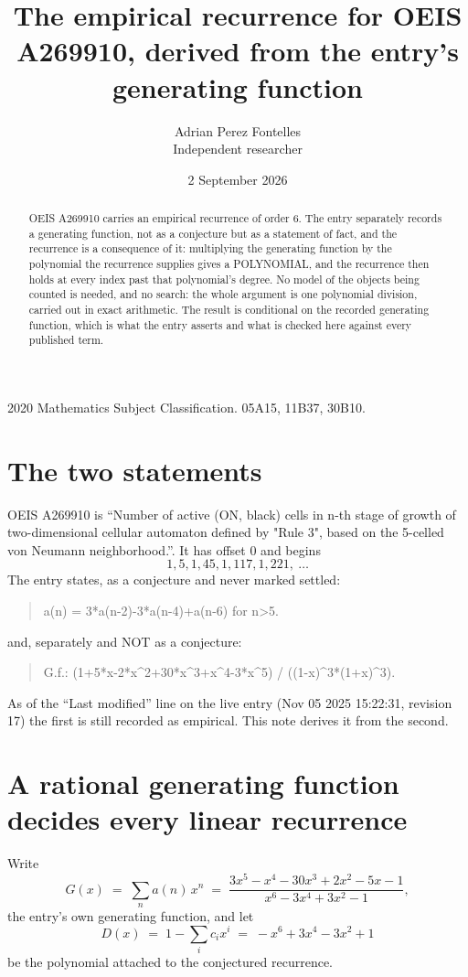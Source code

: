 \documentclass[11pt,a4paper]{article}
\title{The empirical recurrence for OEIS A269910, derived from the entry's generating function}
\author{Adrian Perez Fontelles\\ \small Independent researcher}
\date{2 September 2026}
\theoremstyle{plain}
\theoremstyle{definition}
\begin{document}
\maketitle

\begin{abstract}
OEIS A269910 carries an empirical recurrence of order $6$. The entry separately records a
generating function, not as a conjecture but as a statement of fact, and the recurrence is a
consequence of it: multiplying the generating function by the polynomial the recurrence
supplies gives a POLYNOMIAL, and the recurrence then holds at every index past that
polynomial's degree. No model of the objects being counted is needed, and no search: the
whole argument is one polynomial division, carried out in exact arithmetic. The result is
conditional on the recorded generating function, which is what the entry asserts and what is
checked here against every published term.
\end{abstract}

\noindent\small 2020 Mathematics Subject Classification. 05A15, 11B37, 30B10.\normalsize

\section{The two statements}

OEIS A269910 is ``Number of active (ON, black) cells in n-th stage of growth of two-dimensional cellular automaton defined by "Rule 3", based on the 5-celled von Neumann neighborhood.''. It has offset $0$ and begins
\[
1, 5, 1, 45, 1, 117, 1, 221,\ \dots
\]
The entry states, as a conjecture and never marked settled:
\begin{quote}
a(n) = 3*a(n-2)-3*a(n-4)+a(n-6) for n>5.
\end{quote}
and, separately and NOT as a conjecture:
\begin{quote}
G.f.: (1+5*x-2*x\^{}2+30*x\^{}3+x\^{}4-3*x\^{}5) / ((1-x)\^{}3*(1+x)\^{}3).
\end{quote}
As of the ``Last modified'' line on the live entry (Nov 05 2025 15:22:31, revision 17) the first is still
recorded as empirical. This note derives it from the second.

\section{A rational generating function decides every linear recurrence}

Write
\[
G(x)\;=\;\sum_{n}a(n)\,x^{n}\;=\;\frac{3 x^{5} - x^{4} - 30 x^{3} + 2 x^{2} - 5 x - 1}{x^{6} - 3 x^{4} + 3 x^{2} - 1},
\]
the entry's own generating function, and let
\[
D(x)\;=\;1-\sum_i c_i x^{i}\;=\;- x^{6} + 3 x^{4} - 3 x^{2} + 1
\]
be the polynomial attached to the conjectured recurrence.
\end{document}
